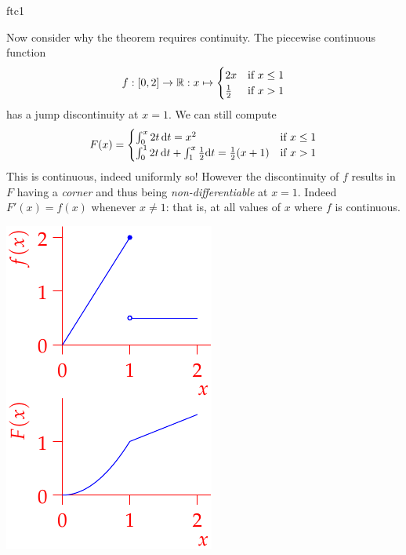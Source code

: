 \begin{examples}{}{ftc1}
\begin{enumerate}
	  
	  \begin{minipage}[t]{0.7\linewidth}\vspace{0pt}
		  \item\label{ex:ftcdiscont} Now consider why the theorem requires continuity. The piecewise continuous function
		  \[
		  	f:[0,2]\to\mathbb{R}:x\mapsto
		  	\begin{cases}
		  		2x&\text{if }x\le 1\\
		  		\frac 12&\text{if }x>1
		  	\end{cases}
		 	\]
		  has a jump discontinuity at $x=1$. We can still compute
		  \[
		  	F(x)=
		  	\begin{cases}
		  		\int_0^x 2t\,{\mathrm{d} t}=x^2&\text{if }x\le 1\\
		  		\int_0^12t\,{\mathrm{d} t}+\int_1^x\frac 12{\mathrm{d} t}=\frac 12(x+1)&\text{if }x>1
		  	\end{cases}
		  \]
		  This is continuous, indeed uniformly so! However the discontinuity of $f$ results in $F$ having a \emph{corner} and thus being \emph{non-differentiable} at $x=1$. Indeed $F'(x)=f(x)$ whenever $x\neq 1$: that is, at all values of $x$ where $f$ is continuous.
	  \end{minipage}
	  \hfill
	  \begin{minipage}[t]{0.29\linewidth}\vspace{0pt}
	  	\flushright\includegraphics[scale=0.95]{ftc1}
	  \end{minipage}
	\end{enumerate}
\end{examples}


